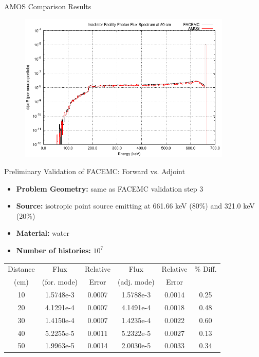 \documentclass{beamer}
\begin{document}
\begin{frame}{AMOS Comparison Results}

  \begin{figure}[h!]
    \begin{center}
      \includegraphics[width=4in]{figures/facemc_amos_irradiator_comp.pdf}
    \end{center}
  \end{figure}

\end{frame}

\begin{frame}{Preliminary Validation of FACEMC: Forward vs. Adjoint}

  \begin{itemize}
    \item \textbf{Problem Geometry:} same as FACEMC validation step 3
    \item \textbf{Source:} isotropic point source emitting at 661.66 keV 
      (80\%) and 321.0 keV (20\%)
    \item \textbf{Material:} water
    \item \textbf{Number of histories:} $10^7$
  \end{itemize}
  
    \begin{table}[ht]
      \centering
      \begin{tabular}{c c c c c c}
        \hline\hline
        Distance & Flux & Relative & Flux & Relative & \% Diff. \\ 
        (cm) & (for. mode) & Error & (adj. mode) & Error &  \\ [0.5ex]
        \hline
        10 & 1.5748e-3 & 0.0007 & 1.5788e-3 & 0.0014 & 0.25 \\
        20 & 4.1291e-4 & 0.0007 & 4.1491e-4 & 0.0018 & 0.48 \\
        30 & 1.4150e-4 & 0.0007 & 1.4235e-4 & 0.0022 & 0.60 \\
        40 & 5.2255e-5 & 0.0011 & 5.2322e-5 & 0.0027 & 0.13 \\
        50 & 1.9963e-5 & 0.0014 & 2.0030e-5 & 0.0033 & 0.34 \\ [1ex]
        \hline
      \end{tabular}
      \label{table:val_plan_s3_c0_flux_water}
    \end{table}   

\end{frame}
\end{document}
